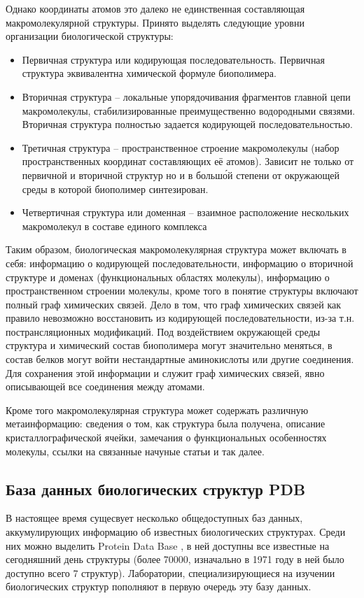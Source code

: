 \documentclass[a4paper, 12pt, titlepage, utf8]{extarticle}
\begin{document}
Однако координаты атомов это далеко не единственная составляющая макромолекулярной структуры. Принято выделять следующие уровни организации биологической структуры:
\begin{itemize}
    \item Первичная структура или кодирующая последовательность. Первичная структура эквивалентна химической формуле биополимера.
    \item Вторичная структура -- локальные упорядочивания фрагментов главной цепи макромолекулы, стабилизированные преимущественно водородными связями. Вторичная структура полностью задается кодирующей последовательностью.
    \item Третичная структура -- пространственное строение макромолекулы (набор пространственных координат составляющих её атомов). Зависит не только от первичной и вторичной структур но и в больш\'{о}й степени от окружающей среды в которой биополимер синтезирован. 
    \item Четвертичная структура или доменная -- взаимное расположение нескольких макромолекул в составе единого комплекса 
\end{itemize}

Таким образом, биологическая макромолекулярная структура может включать в себя: информацию о кодирующей последовательности, информацию о вторичной структуре и доменах (функциональных областях молекулы), информацию о пространственном строении молекулы, кроме того в понятие структуры включают полный граф химических связей. Дело в том, что граф химических связей как правило невозможно восстановить из кодирующей последовательности, из-за т.н. пострансляционных модификаций. Под воздействием окружающей среды структура и химический состав биополимера могут значительно меняться, в состав белков могут войти нестандартные аминокислоты или другие соединения. Для сохранения этой информации и служит граф химических связей, явно описывающей все соединения между атомами.
 
Кроме того макромолекулярная структура может содержать различную метаинформацию: сведения о том, как структура была получена, описание кристаллографической ячейки, замечания о функциональных особенностях молекулы, ссылки на связанные начуные статьи и так далее.

\subsection{База данных биологических структур PDB}
В настоящее время сущесвует несколько общедоступных баз данных, аккумулирующих информацию об известных биологических структурах. Среди них можно выделить Protein Data Base \cite{pdb}, в ней доступны все известные на сегодняшний день структуры (более 70000,  изначально в 1971 году в ней было доступно всего 7 структур). Лаборатории, специализирующиеся на изучении биологических структур пополняют в первую очередь эту базу данных. 
\end{document}
